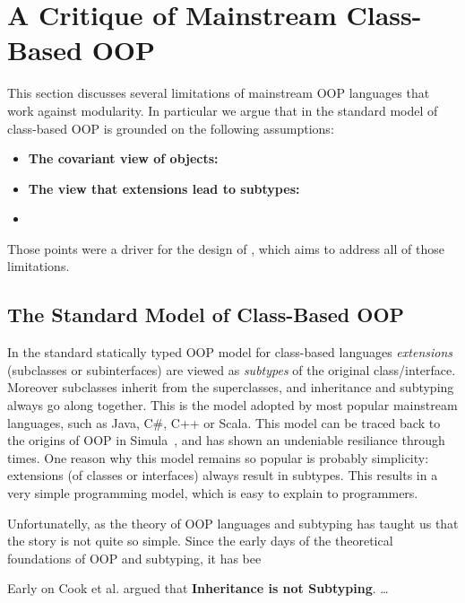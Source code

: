 \section{A Critique of Mainstream Class-Based OOP}
\label{sec:critique}

This section discusses several limitations of mainstream OOP languages
that work against modularity. In particular we argue that in the
standard model of class-based OOP is grounded on the following 
assumptions:

\begin{itemize}

\item {\bf The covariant view of objects:} 

\item {\bf The view that extensions lead to subtypes:}

\item {\bf }

\end{itemize}

Those points were a driver for the
design of \name, which aims to address all of those limitations. 

\subsection{The Standard Model of Class-Based OOP}

In the standard statically typed OOP model for class-based languages
\emph{extensions} (subclasses or subinterfaces) are viewed as \emph{subtypes} of the original
class/interface. Moreover subclasses inherit from the superclasses,
and inheritance and subtyping always go along together.
This is the model adopted by most popular mainstream
languages, such as Java, C\#, C++ or Scala. This model can be traced
back to the origins of OOP in Simula~\cite{}, and has shown an 
undeniable resiliance through times. One reason why this model remains 
so popular is probably simplicity: 
extensions (of classes or interfaces) always result in subtypes.  
This results in a very simple programming model, which is easy 
to explain to programmers.  

Unfortunatelly, as the theory of OOP languages and subtyping has taught 
us that the story is not quite so simple. Since the early days of the
theoretical foundations of OOP and subtyping, it has bee

Early on Cook et al. argued
that {\bf Inheritance is not Subtyping}. \ldots

